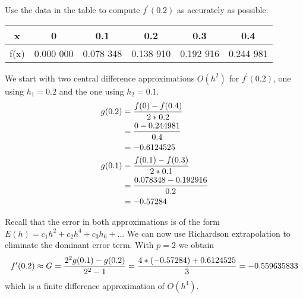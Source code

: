 \begin{exercise}{4}
Use the data in the table to compute $f^\prime (0.2)$ as accurately as possible:
\begin{table}[h]
\centering
\begin{tabular}{|c|c|c|c|c|c|}
\hline
x &0& 0.1& 0.2& 0.3& 0.4\\ \hline
f(x)& 0.000 000& 0.078 348 &0.138 910& 0.192 916 &0.244 981 \\ \hline
\end{tabular}
\end{table}

We start with two central difference approximations $O(h^2)$ for $f^{\prime}(0.2)$, one using $h_1=0.2$ and the one using $h_2=0.1$.
\begin{align}
g(0.2)&=\frac{f(0) - f(0.4)}{2*0.2} \notag \\
			&=\frac{0 - 0.244981}{0.4} \notag \\
            &=-0.6124525 \notag \\
g(0.1)&=\frac{f(0.1) - f(0.3)}{2*0.1} \notag \\
			&=\frac{0.078348 - 0.192916}{0.2} \notag \\
            &=-0.57284 \notag
\end{align}

Recall that the error in both approximations is of the form \(E(h) = c_1h^2 + c_2h^4+c_3h_6 +...\) We can now use Richardson extrapolation to eliminate the dominant error term. With $p = 2$ we obtain
\begin{align}
f^{\prime}(0.2) \approx G = \frac{2^2g(0.1)-g(0.2)}{2^2-1} = \frac{4*(-0.57284)+0.6124525}{3}
= -0.559635833 \notag
\end{align}
which is a finite difference approximation of \(O(h^4)\).
\end{exercise}

